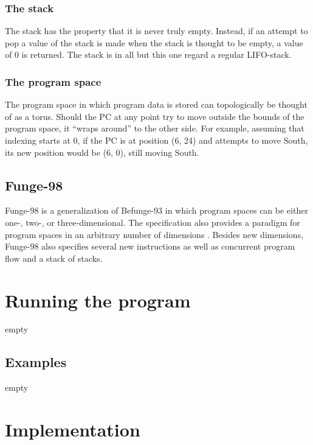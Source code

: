 \documentclass[12pt, a4paper]{article}
\begin{document}
\subsubsection{The stack}
\label{sec:stack}

The stack has the property that it is never truly empty. Instead, if an attempt to pop a value of the stack is made when the stack is thought to be empty, a value of 0 is returned. The stack is in all but this one regard a regular LIFO-stack.

\subsubsection{The program space}

The program space in which program data is stored can topologically be thought of as a torus. Should the PC at any point try to move outside the bounds of the program space, it “wraps around” to the other side. For example, assuming that indexing starts at 0, if the PC is at position (6, 24) and attempts to move South, its new position would be \linebreak (6, 0), still moving South.

\subsection{Funge-98}
\label{sec:funge98}

Funge-98 is a generalization of Befunge-93 in which program spaces can be either one-, two-, or three-dimensional. The specification also provides a paradigm for program spaces in an arbitrary number of dimensions \cite{funge98}. Besides new dimensions, Funge-98 also specifies several new instructions as well as concurrent program flow and a stack of stacks.

\section{Running the program}
\label{sec:howtorun}

empty

\subsection{Examples}
\label{sec:examples}

empty

\section{Implementation}
\label{sec:impl}
\end{document}
